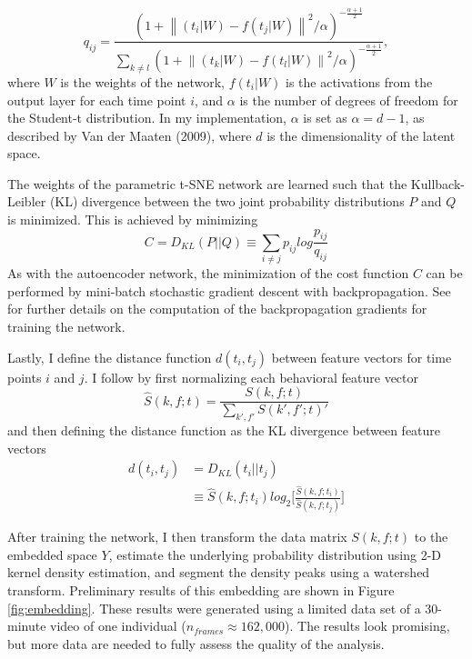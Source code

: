 \documentclass[11pt,a4paper,oneside]{article}
\newcommand{\norm}[1]{\left\lVert#1\right\rVert}
\begin{document}
\begin{appendices}
\begin{equation}
q_{ij} = \frac{(1+\norm{(t_i|W)-f(t_j|W)}^2/\alpha)^{-\frac{\alpha + 1}{2}}}{\sum_{k\neq l}(1+\norm{(t_k|W)-f(t_l|W)}^2/\alpha)^{-\frac{\alpha + 1}{2}}},
\end{equation}
where $W$ is the weights of the network, $f(t_i|W)$ is the activations from the output layer for each time point $i$, and $\alpha$ is the number of degrees of freedom for the Student-t distribution. In my implementation, $\alpha$ is set as $\alpha = d -1$, as described by Van der Maaten (2009), where $d$ is the dimensionality of the latent space.
\par
The weights of the parametric t-SNE network are learned such that the Kullback-Leibler (KL) divergence between the two joint probability distributions $P$ and $Q$ is minimized. This is achieved by minimizing
\begin{equation}
C = D_{KL}(P||Q) \equiv \sum_{i\neq j}p_{ij}log\frac{p_{ij}}{q_{ij}}
\end{equation}
As with the autoencoder network, the minimization of the cost function $C$ can be performed by mini-batch stochastic gradient descent with backpropagation. See \citet{vandermaaten2009ptsne} for further details on the computation of the backpropagation gradients for training the network.
\par
Lastly, I define the distance function $d(t_i,t_j)$ between feature vectors for time points $i$ and $j$. I follow \citealt{berman2014drosopholid,berman2014mapping} by first normalizing each behavioral feature vector
\begin{equation}
\hat{S}(k,f;t) = \frac{S(k,f;t)}{\sum_{k',f'}S(k',f';t)'}
\end{equation}
and then defining the distance function as the KL divergence between feature vectors
\begin{equation}
\begin{split}
d(t_i,t_j) & = D_{KL}(t_i||t_j) \\
& \equiv \hat{S}(k,f;t_i)log_2\bigg[\frac{\hat{S}(k,f;t_i)}{\hat{S}(k,f;t_j)}\bigg]
\end{split}
\end{equation}

After training the network, I then transform the data matrix $S(k,f;t)$ to the embedded space $Y$, estimate the underlying probability distribution using 2-D kernel density estimation, and segment the density peaks using a watershed transform. Preliminary results of this embedding are shown in Figure \ref{fig:embedding}. These results were generated using a limited data set of a 30-minute video of one individual ($n_{frames}\approx 162,000$). The results look promising, but more data are needed to fully assess the quality of the analysis.


\end{appendices}
\end{document}
